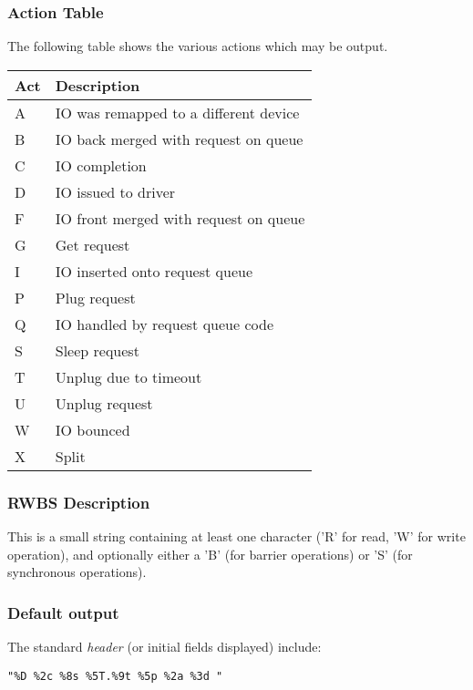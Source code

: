 \documentclass{article}
\begin{document}
\newpage
\subsubsection{\label{sec:act-table}Action Table}
The following table shows the various actions which may be output.

\begin{tabular}{|l|l|}\hline
Act & Description \\ \hline\hline
A & IO was remapped to a different device \\ \hline
B & IO back merged with request on queue \\ \hline
C & IO completion \\ \hline
D & IO issued to driver \\ \hline
F & IO front merged with request on queue \\ \hline
G & Get request \\ \hline
I & IO inserted onto request queue \\ \hline
P & Plug request \\ \hline
Q & IO handled by request queue code \\ \hline
S & Sleep request \\ \hline
T & Unplug due to timeout \\ \hline
U & Unplug request \\ \hline
W & IO bounced \\ \hline
X & Split \\ \hline
\end{tabular}

\subsubsection{\label{sec:act-table}RWBS Description}
This is a small string containing at least one character ('R' for read,
'W' for write operation), and optionally either a 'B' (for barrier
operations) or 'S' (for synchronous operations).

\subsubsection{\label{sec:default-output}Default output}

The standard \emph{header} (or initial fields displayed) include:

\begin{verbatim}
"%D %2c %8s %5T.%9t %5p %2a %3d "
\end{verbatim}
\end{document}

